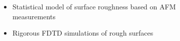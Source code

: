 \documentclass{beamer}
\begin{document}
\begin{frame}
\begin{columns}
\begin{column}{0.5\textwidth}
\begin{figure}
			\end{figure}
		\end{column}
		\begin{column}{0.5\textwidth}
			\begin{itemize}
				\item Statistical model of surface roughness based on AFM measurements\\
				\item Rigorous FDTD simulations of rough surfaces \\
			\end{itemize}
			
		\end{column}
	\end{columns}
	{\tiny \cite{Stolarek_2013}}
		
\end{frame}
\end{document}
